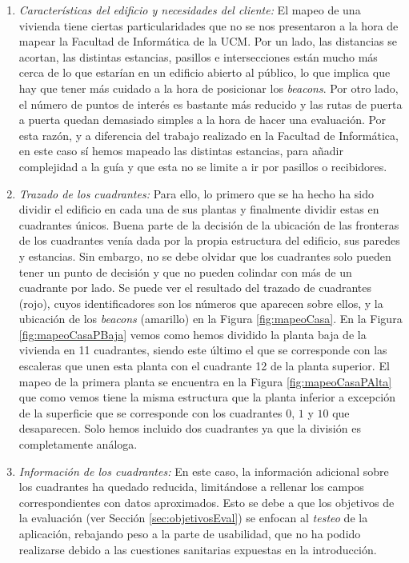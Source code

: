 \begin{enumerate}
	\item \textit{Características del edificio y necesidades del cliente:} El mapeo de una vivienda tiene ciertas particularidades que no se nos presentaron a la hora de mapear la Facultad de Informática de la UCM. Por un lado, las distancias se acortan, las distintas estancias, pasillos e intersecciones están mucho más cerca de lo que estarían en un edificio abierto al público, lo que implica que hay que tener más cuidado a la hora de posicionar los \textit{beacons}. Por otro lado, el número de puntos de interés es bastante más reducido y las rutas de puerta a puerta quedan demasiado simples a la hora de hacer una evaluación. Por esta razón, y a diferencia del trabajo realizado en la Facultad de Informática, en este caso sí hemos mapeado las distintas estancias, para añadir complejidad a la guía y que esta no se limite a ir por pasillos o recibidores.
	
	\item \textit{Trazado de los cuadrantes:} Para ello, lo primero que se ha hecho ha sido dividir el edificio en cada una de sus plantas y finalmente dividir estas en cuadrantes únicos. Buena parte de la decisión de la ubicación de las fronteras de los cuadrantes venía dada por la propia estructura del edificio, sus paredes y estancias. Sin embargo, no se debe olvidar que los cuadrantes solo pueden tener un punto de decisión y que no pueden colindar con más de un cuadrante por lado. Se puede ver el resultado del trazado de cuadrantes (rojo), cuyos identificadores son los números que aparecen sobre ellos, y la ubicación de los \textit{beacons} (amarillo) en la Figura \ref{fig:mapeoCasa}. En la Figura \ref{fig:mapeoCasaPBaja} vemos como hemos dividido la planta baja de la vivienda en 11 cuadrantes, siendo este último el que se corresponde con las escaleras que unen esta planta con el cuadrante 12 de la planta superior. El mapeo de la primera planta se encuentra en la Figura \ref{fig:mapeoCasaPAlta} que como vemos tiene la misma estructura que la planta inferior a excepción de la superficie que se corresponde con los cuadrantes $0$, $1$ y $10$ que desaparecen. Solo hemos incluido dos cuadrantes ya que la división es completamente análoga.	
	
	\item \textit{Información de los cuadrantes:} En este caso, la información adicional sobre los cuadrantes ha quedado reducida, limitándose a rellenar los campos correspondientes con datos aproximados. Esto se debe a que los objetivos de la evaluación (ver Sección \ref{sec:objetivosEval}) se enfocan al \textit{testeo} de la aplicación, rebajando peso a la parte de usabilidad, que no ha podido realizarse debido a las cuestiones sanitarias expuestas en la introducción. 
	

\end{enumerate}

